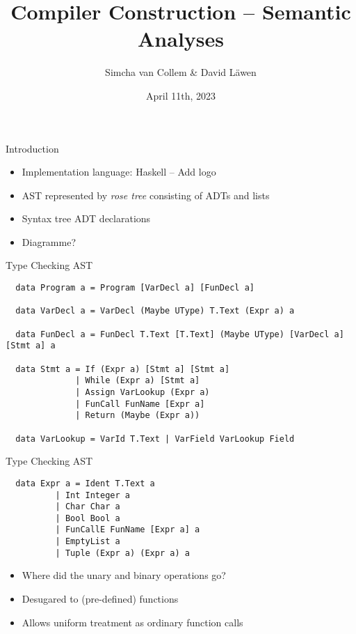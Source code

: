 \documentclass[dvipsnames,aspectratio=169]{beamer}
\title[Compiler Construction -- Phase 2]%
{Compiler Construction -- Semantic Analyses}
\subtitle
{}
\author%
{Simcha van Collem \& David Läwen}
\institute[]%
{MFoCS Seminar}
\date[April 11th, 2023] %
{April 11th, 2023}
\begin{document}
\begin{frame}
  \titlepage
\end{frame}

\begin{frame}{Introduction}

  \begin{itemize}
    \item Implementation language: Haskell -- Add logo
    \item AST represented by \emph{rose tree} consisting of ADTs and lists
    \item Syntax tree ADT declarations
    \item Diagramme?
  \end{itemize}

\end{frame}


\begin{frame}[fragile]{Type Checking AST}

  \begin{verbatim}
  data Program a = Program [VarDecl a] [FunDecl a]

  data VarDecl a = VarDecl (Maybe UType) T.Text (Expr a) a

  data FunDecl a = FunDecl T.Text [T.Text] (Maybe UType) [VarDecl a] [Stmt a] a

  data Stmt a = If (Expr a) [Stmt a] [Stmt a]
              | While (Expr a) [Stmt a]
              | Assign VarLookup (Expr a)
              | FunCall FunName [Expr a]
              | Return (Maybe (Expr a))

  data VarLookup = VarId T.Text | VarField VarLookup Field

  \end{verbatim}

\end{frame}


\begin{frame}[fragile]{Type Checking AST}

  \begin{verbatim}
  data Expr a = Ident T.Text a
          | Int Integer a
          | Char Char a
          | Bool Bool a
          | FunCallE FunName [Expr a] a
          | EmptyList a
          | Tuple (Expr a) (Expr a) a
  \end{verbatim}

  \begin{itemize}
    \item Where did the unary and binary operations go?
    \item Desugared to (pre-defined) functions
    \item Allows uniform treatment as ordinary function calls
  \end{itemize}


\end{frame}
\end{document}
